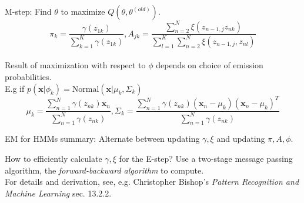 \documentclass[10pt]{beamer}
\begin{document}
\begin{frame}
\begin{sblock}{M-step: Find $\theta$ to maximize $Q(\theta, \theta^{(old)})$.}
$$\pi_k = \frac{\gamma(z_{1k})}{\sum_{k=1}^K \gamma(z_{1k})}, A_{jk} = \frac {\sum_{n=2}^N \xi(z_{n-1, j} z_{nk})}{\sum_{l=1}^K\sum_{n=2}^N \xi(z_{n-1,j},z_{nl})}$$ \\
Result of maximization with respect to $\phi$ depends on choice of emission probabilities.\\
E.g if $p(\mathbf{x}| \phi_k) = \text{Normal}(\mathbf{x}|\mu_k, \Sigma_k)$\\
$$\mu_k = \frac{\sum_{n=1}^N \gamma(z_{nk})\mathbf{x}_n}{\sum_{n=1}^N \gamma(z_{nk})}, \Sigma_k = \frac{\sum_{n=1}^N \gamma(z_{nk})(\mathbf{x}_n - \mu_k)(\mathbf{x}_n - \mu_k)^T}{\sum_{n=1}^N \gamma(z_{nk})}$$
\end{sblock}
\begin{sblock}{EM for HMMs summary:}
Alternate between updating $\gamma, \xi$ and updating $\pi, A, \phi$.
\end{sblock}
\end{frame}

\begin{frame}
\begin{sblock}{How to efficiently calculate $\gamma, \xi$ for the E-step?}
Use a two-stage message passing algorithm, the \textit{forward-backward algorithm} to compute.\\
For details and derivation, see, e.g. Christopher Bishop's \textit{Pattern Recognition and Machine Learning} sec. 13.2.2. 
\end{sblock}
\end{frame}



%
%
%

\end{document}
